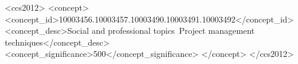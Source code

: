 \documentclass{sig-alternate-05-2015}
\begin{document}
%
%
\begin{CCSXML}
	<ccs2012>
	<concept>
	<concept_id>10003456.10003457.10003490.10003491.10003492</concept_id>
	<concept_desc>Social and professional topics~Project management techniques</concept_desc>
	<concept_significance>500</concept_significance>
	</concept>
	</ccs2012>
\end{CCSXML}



%
%

%
%
\printccsdesc


\end{document}
